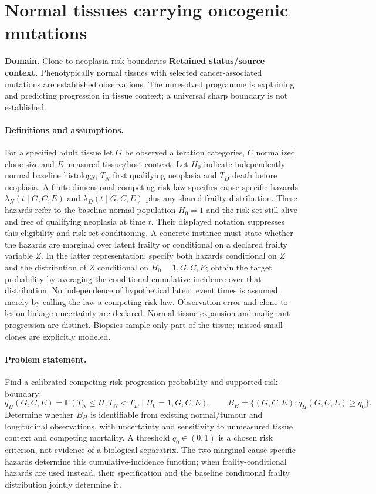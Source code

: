 \documentclass[11pt]{article}
\begin{document}
\section*{Normal tissues carrying oncogenic mutations}
\label{prob:250}
\label{rank:38}
\par\smallskip

\noindent\textbf{Domain.} Clone-to-neoplasia risk boundaries \quad \textbf{Retained status/source context.} Phenotypically normal tissues with selected cancer-associated mutations are established observations. The unresolved programme is explaining and predicting progression in tissue context; a universal sharp boundary is not established.
\paragraph{Definitions and assumptions.} For a specified adult tissue let $G$ be observed alteration categories, $C$ normalized clone size and $E$ measured tissue/host context. Let $H_0$ indicate independently normal baseline histology, $T_N$ first qualifying neoplasia and $T_D$ death before neoplasia. A finite-dimensional competing-risk law specifies cause-specific hazards $\lambda_N(t\mid G,C,E)$ and $\lambda_D(t\mid G,C,E)$ plus any shared frailty distribution. These hazards refer to the baseline-normal population $H_0=1$ and the risk set still alive and free of qualifying neoplasia at time $t$. Their displayed notation suppresses this eligibility and risk-set conditioning. A concrete instance must state whether the hazards are marginal over latent frailty or conditional on a declared frailty variable $Z$. In the latter representation, specify both hazards conditional on $Z$ and the distribution of $Z$ conditional on $H_0=1,G,C,E$; obtain the target probability by averaging the conditional cumulative incidence over that distribution. No independence of hypothetical latent event times is assumed merely by calling the law a competing-risk law. Observation error and clone-to-lesion linkage uncertainty are declared. Normal-tissue expansion and malignant progression are distinct. Biopsies sample only part of the tissue; missed small clones are explicitly modeled.
\paragraph{Problem statement.} Find a calibrated competing-risk progression probability and supported risk boundary:
\[q_H(G,C,E)=\mathbb{P}(T_N\leq H,T_N<T_D\mid H_0=1,G,C,E),\qquad
B_H=\{(G,C,E):q_H(G,C,E)\geq q_0\}.\]
Determine whether $B_H$ is identifiable from existing normal/tumour and longitudinal observations, with uncertainty and sensitivity to unmeasured tissue context and competing mortality. A threshold $q_0\in(0,1)$ is a chosen risk criterion, not evidence of a biological separatrix. The two marginal cause-specific hazards determine this cumulative-incidence function; when frailty-conditional hazards are used instead, their specification and the baseline conditional frailty distribution jointly determine it.
\end{document}
